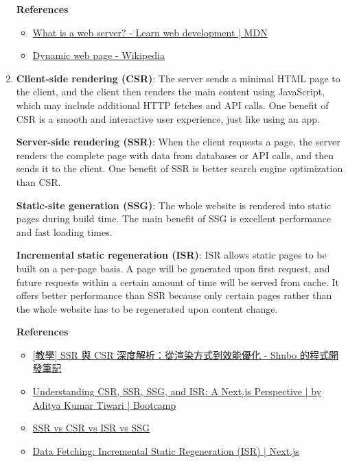 \documentclass[12pt, a4paper]{article}
\begin{document}
\begin{enumerate}
    \textbf{References}
    \begin{itemize}
      \item \href{https://developer.mozilla.org/en-US/docs/Learn/Common_questions/Web_mechanics/What_is_a_web_server}{What is a web server? - Learn web development | MDN}
      \item \href{https://en.wikipedia.org/wiki/Dynamic_web_page}{Dynamic web page - Wikipedia}
    \end{itemize}

    \pagebreak
    \item \textbf{Client-side rendering (CSR)}: The server sends a minimal HTML page
    to the client, and the client then renders the main content  using JavaScript,
    which may include additional HTTP fetches and API calls. One benefit of CSR is a smooth and interactive user experience, just like using an app.

    \textbf{Server-side rendering (SSR)}: When the client requests a page, the server
    renders the complete page with data from databases or API calls, and then sends it
    to the client. One benefit of SSR is better search engine optimization than CSR.

    \textbf{Static-site generation (SSG)}: The whole website is rendered into
    static pages during build time. The main benefit of SSG is excellent performance
    and fast loading times.

    \textbf{Incremental static regeneration (ISR)}: ISR allows static pages
    to be built on a per-page basis. A page will be generated upon first request,
    and future requests within a certain amount of time will be served from cache.
    It offers better performance than SSR because only certain pages rather than
    the whole website has to be regenerated upon content change.

    \textbf{References}
    \begin{itemize}
      \item \href{https://www.shubo.io/rendering-patterns/}{[教學] SSR 與 CSR 深度解析：從渲染方式到效能優化 - Shubo 的程式開發筆記}
      \item \href{https://bootcamp.uxdesign.cc/understanding-csr-ssr-ssg-and-isr-a-next-js-perspective-fcaf36686de6}{Understanding CSR, SSR, SSG, and ISR: A Next.js Perspective | by Aditya Kumar Tiwari | Bootcamp}
      \item \href{https://www.educative.io/answers/ssr-vs-csr-vs-isr-vs-ssg}{SSR vs CSR vs ISR vs SSG}
      \item \href{https://nextjs.org/docs/pages/building-your-application/data-fetching/incremental-static-regeneration}{Data Fetching: Incremental Static Regeneration (ISR) | Next.js}
    \end{itemize}


\end{enumerate}
\end{document}
